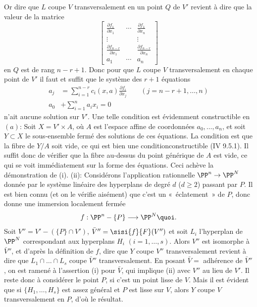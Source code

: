 \documentclass[10pt]{../fichiers-configuration-latex/smfart}
\begin{document}
Or dire que $L$ coupe $V$ transversalement en un point $Q$ de $V'$
revient à dire que la valeur de la matrice
$$
\begin{bmatrix}
\frac{\partial f_1}{\partial x_1} & \cdots & \frac{\partial
  f_1}{\partial x_n}\\
\vdots & &\vdots\\
\frac{\partial f_{n-r}}{\partial x_1} & & \frac{\partial
  f_{n-r}}{\partial x_n}\\
a_1 & \cdots & a_n
\end{bmatrix}
$$
en $Q$ est de rang $n-r+1$. Donc pour que $L$ coupe $V$
transversalement en chaque point de $V'$ il faut et suffit que le
système des $r+1$ équations
\begin{align*}
a_j &= \sum^{n-r}_{i=1} c_i (x,a)\frac{\partial f_i}{\partial x_j}\qquad
(j=n-r+1,\ldots, n)\\
a_0 &+ \sum^n_{i=1} a_i x_i =0
\end{align*}
n'ait aucune solution sur $V'$. Une telle condition est évidemment
constructible en $(a)$: Soit $X=V'\times A$, où $A$ est l'espace affine
de coordonnées $a_0,\ldots,a_n$, et soit $Y\subset X$ le
sous-ensemble fermé des solutions de ces équations. La condition est
que la fibre de $Y/A$ soit vide, ce qui est bien une
condition\pageoriginale constructible (\EGA IV 9.5.1). Il suffit donc %
de vérifier que la fibre au-dessus du point générique de $A$ est vide,
ce qui se voit immédiatement sur la forme des équations. Ceci achève
la démonstration de (i). (ii): Considérons l'application rationnelle
$\PP^n\rightarrow \PP^N$ donnée par le système linéaire
des hyperplans de degré $d$ ($d\geq 2$) passant par $P$. Il est bien
connu (et on le vérifie aisément) que c'est un « éclatement » de
$P$, donc donne une immersion localement fermée
$$
f:\PP^n-\{P\}\longrightarrow \PP^N{\quoi}.
$$
Soit $V''=V'-(\{P\}\cap V')$, $\bar{V}{}''=\sisi{f}{F}(V'')$ et soit $L_i$
l'hyperplan de $\PP^N$ correspondant aux hyperplans $H_i$
$(i=1,\ldots,s)$. Alors $V''$ est isomorphe à $\bar{V}{}''$, et d'après
la définition de $f$, dire que $Y$ coupe $V''$ transversalement
revient à dire que $L_1\cap\ldots \cap L_s$ coupe $\bar{V}{}''$
transversalement. En posant $\bar{V}=$ adhérence de $\bar{V}{}''$, on
est ramené à l'assertion (i) pour $\bar{V}$, qui implique (ii) avec
$V''$ au lieu de $V'$. Il reste donc à considérer le point $P$, si
c'est un point lisse de $V$. Mais il est évident que si
$\{H_1,\ldots,H_s\}$ est assez général et $P$ est lisse sur $V$, alors
$Y$ coupe $V$ transversalement en $P$, d'où le résultat.
\end{document}
